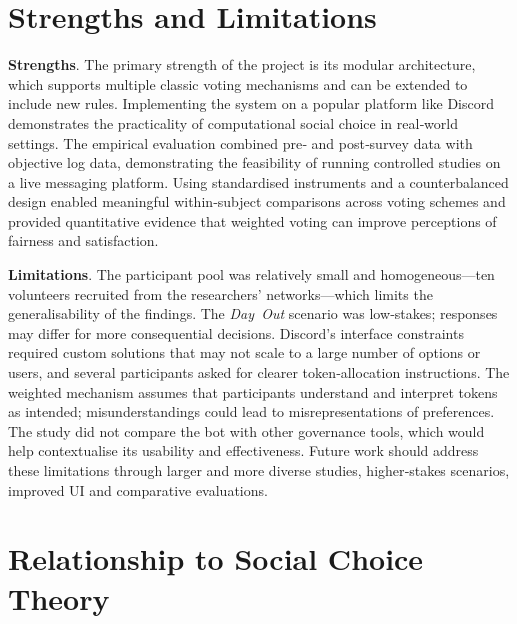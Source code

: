 \section{Strengths and Limitations}

\textbf{Strengths}.  The primary strength of the project is its modular
architecture, which supports multiple classic voting mechanisms and can be
extended to include new rules.  Implementing the system on a popular
platform like Discord demonstrates the practicality of computational social
choice in real‑world settings.  The empirical evaluation combined pre‑ and
post‑survey data with objective log data, demonstrating the feasibility of
running controlled studies on a live messaging platform.  Using
standardised instruments and a counterbalanced design enabled meaningful
within‑subject comparisons across voting schemes and provided quantitative
evidence that weighted voting can improve perceptions of fairness and
satisfaction.

\textbf{Limitations}.  The participant pool was relatively small and
homogeneous—ten volunteers recruited from the researchers’ networks—which
limits the generalisability of the findings.  The \emph{Day~Out} scenario
was low‑stakes; responses may differ for more consequential decisions.
Discord’s interface constraints required custom solutions that may not
scale to a large number of options or users, and several participants
asked for clearer token‑allocation instructions.  The weighted mechanism
assumes that participants understand and interpret tokens as intended;
misunderstandings could lead to misrepresentations of preferences.  The
study did not compare the bot with other governance tools, which would
help contextualise its usability and effectiveness.  Future work should
address these limitations through larger and more diverse studies,
higher‑stakes scenarios, improved UI and comparative
evaluations.

\section{Relationship to Social Choice Theory}

